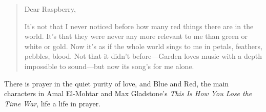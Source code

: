 \begin{quote}
Dear Raspberry,

It's not that I never noticed before how many red things there are in the world. It's that they were never any more relevant to me than green or white or gold. Now it's as if the whole world sings to me in petals, feathers, pebbles, blood. Not that it didn't before---Garden loves music with a depth impossible to sound---but now its song's for me alone.

\parencite[119--120]{timewar}
\end{quote}

There is prayer in the quiet purity of love, and Blue and Red, the main characters in Amal El-Mohtar and Max Gladstone's \emph{This Is How You Lose the Time War}, life a life in prayer.
